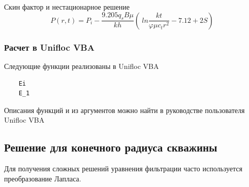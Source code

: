 Скин фактор и нестационарное решение
$$ P(r, t) = P_{i} - \frac {9.205 {q_s} B\mu }{k h}(\ ln\frac {k t}{ \varphi \mu {c_t} {r^2}} -7.12 + 2S) $$



\subsubsection{Расчет в Unifloc VBA}

Следующие функции реализованы в Unifloc VBA

\begin{verbatim}
	Ei
	E_1
\end{verbatim}	

Описания функций и из аргументов можно найти в руководстве пользователя  Unifloc VBA

\subsection{Решение для конечного радиуса скважины}
Для получения сложных решений уравнения фильтрации часто используется преобразование Лапласа.

